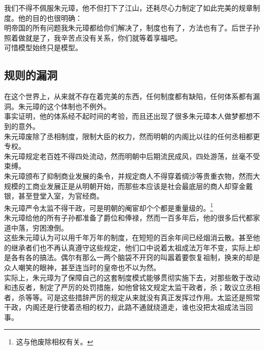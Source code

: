 \begin{multicols}{\theparacolNo}
我们不得不佩服朱元璋，他不但打下了江山，还耗尽心力制定了如此完美的规章制度。他的目的也很明确：\\

明帝国的所有问题我朱元璋都给你们解决了，制度也有了，方法也有了。后世子孙照着做就是了，我辛苦点没有关系，你们就等着享福吧。\\

可惜模型始终只是模型。\\

\subsection{规则的漏洞}
在这个世界上，从来就不存在着完美的东西，任何制度都有缺陷，任何体系都有漏洞。朱元璋的这个体制也不例外。\\

事实证明，他的体系经不起时间的考验，而且还出现了很多朱元璋本人做梦都想不到的意外。\\

朱元璋废除了丞相制度，限制大臣的权力，然而明朝的内阁比以往的任何丞相都更专权。\\

朱元璋规定老百姓不得四处流动，然而明朝中后期流民成风，四处游荡，丝毫不受束缚。\\

朱元璋颁布了抑制商业发展的条令，并规定商人不得穿着绸沙等贵重衣物，然而大规模的工商业发展正是从明朝开始，而那些本应该是社会最底层的商人却穿金戴银，甚至登堂入室，为官经商。\\

朱元璋严令太监不得干政，可是明朝的阉宦却个个都是重量级的。\footnote{这与他废除相权有关。}\\

朱元璋给他的所有子孙都准备了爵位和俸禄，然而一百多年后，他的很多后代都家道中落，穷困潦倒。\\

这些朱元璋认为可以用千年万年的制度，在短短的百余年间已经烟消云散。甚至他的继承者们也不再认真遵守这些规定，他们口中说着太祖成法万年不变，实际上却是各有各的搞法。偶尔有那么一两个脑袋不开窍的叫嚣着要恢复祖制，换来的却是众人嘲笑的眼神，甚至连当时的皇帝也不以为然。\\

实际上，朱元璋为了保障自己的这套制度模式能够贯彻实施下去，对那些敢于改动和违反者，制定了严厉的处罚措施，如他曾铭文规定太监干政者，杀；敢议立丞相者，杀等等。可是这些措辞严厉的规定从来就没有真正发挥过作用。太监还是照常干政，内阁还是行使着丞相的权力，此路不通就绕道走，谁也没把太祖成法当回事。\\


\end{multicols}
